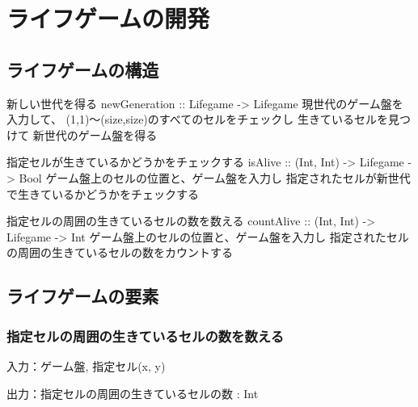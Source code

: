 \documentclass{jsarticle}
\begin{document}
\section{ライフゲームの開発}
\subsection{ライフゲームの構造}

新しい世代を得る 
newGeneration :: Lifegame -> Lifegame
	現世代のゲーム盤を入力して、
	(1,1)～(size,size)のすべてのセルをチェックし
	生きているセルを見つけて
	新世代のゲーム盤を得る

指定セルが生きているかどうかをチェックする
isAlive :: (Int, Int) -> Lifegame -> Bool
	ゲーム盤上のセルの位置と、ゲーム盤を入力し
	指定されたセルが新世代で生きているかどうかをチェックする

指定セルの周囲の生きているセルの数を数える
countAlive :: (Int, Int) -> Lifegame -> Int
	ゲーム盤上のセルの位置と、ゲーム盤を入力し
	指定されたセルの周囲の生きているセルの数をカウントする


\subsection{ライフゲームの要素}
\subsubsection{指定セルの周囲の生きているセルの数を数える}
入力：ゲーム盤, 指定セル(x, y) 

出力：指定セルの周囲の生きているセルの数 : Int
\end{document}
